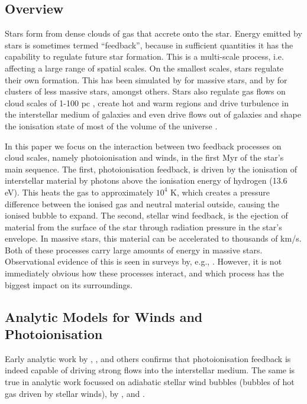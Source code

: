 \documentclass[a4paper,fleqn,usenatbib]{mnras}
\begin{document}
\subsection{Overview}

Stars form from dense clouds of gas that accrete onto the star. Energy emitted by stars is sometimes termed ``feedback'', because in sufficient quantities it has the capability to regulate future star formation. This is a multi-scale process, i.e. affecting a large range of spatial scales. On the smallest scales, stars regulate their own formation. This has been simulated by \cite{Kuiper2018} for massive stars, and by \cite{Bate2019} for clusters of less massive stars, amongst others. Stars also regulate gas flows on cloud scales of 1-100 pc \citep[see review by][]{Dale2015a}, create hot and warm regions and drive turbulence in the interstellar medium of galaxies \cite[e.g.][]{Gatto2017} and even drive flows out of galaxies \citep[see review on galactic winds by][]{Veilleux2005} and shape the ionisation state of most of the volume of the universe \citep[e.g.][]{Rosdahl2018}.

In this paper we focus on the interaction between two feedback processes on cloud scales, namely photoionisation and winds, in the first Myr of the star's main sequence. The first, photoionisation feedback, is driven by the ionisation of interstellar material by photons above the ionisation energy of hydrogen (13.6 eV). This heats the gas to approximately $10^4$ K, which creates a pressure difference between the ionised gas and neutral material outside, causing the ionised bubble to expand. The second, stellar wind feedback, is the ejection of material from the surface of the star through radiation pressure in the star's envelope. In massive stars, this material can be accelerated to thousands of km/s. Both of these processes carry large amounts of energy in massive stars. Observational evidence of this is seen in surveys by, e.g., \cite{Doran2013}. However, it is not immediately obvious how these processes interact, and which process has the biggest impact on its surroundings.

\subsection{Analytic Models for Winds and Photoionisation}

Early analytic work by \cite{KahnF.D.1954}, \cite{SpitzerLyman1978}, \cite{Whitworth1979} and others confirms that photoionisation feedback is indeed capable of driving strong flows into the interstellar medium. The same is true in analytic work focussed on adiabatic stellar wind bubbles (bubbles of hot gas driven by stellar winds), by \cite{Avedisova1972}, \cite{Castor1975} and \cite{Weaver1977}.
\end{document}
